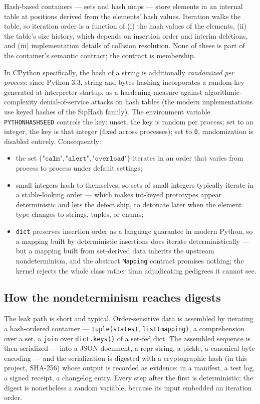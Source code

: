 Hash-based containers --- sets and hash maps --- store elements in an
internal table at positions derived from the elements' hash values.
Iteration walks the table, so iteration order is a function of (i) the hash
values of the elements, (ii) the table's size history, which depends on
insertion order and interim deletions, and (iii) implementation details of
collision resolution. None of these is part of the container's semantic
contract; the contract is membership.

In CPython specifically, the hash of a string is additionally
\emph{randomized per process}: since Python 3.3, string and bytes hashing
incorporates a random key generated at interpreter startup, as a hardening
measure against algorithmic-complexity denial-of-service attacks on hash
tables (the modern implementations use keyed hashes of the SipHash
family). The environment variable \texttt{PYTHONHASHSEED} controls the
key: unset, the key is random per process; set to an integer, the key is
that integer (fixed across processes); set to \texttt{0}, randomization is
disabled entirely. Consequently:

\begin{itemize}
\item the set $\{ \texttt{"calm"}, \texttt{"alert"}, \texttt{"overload"}
\}$ iterates in an order that varies from process to process under default
settings;
\item small integers hash to themselves, so sets of small integers
typically iterate in a stable-looking order --- which makes int-keyed
prototypes appear deterministic and lets the defect ship, to detonate later
when the element type changes to strings, tuples, or enums;
\item \texttt{dict} preserves insertion order as a language guarantee in
modern Python, so a mapping built by deterministic insertions does iterate
deterministically --- but a mapping built from set-derived data inherits
the upstream nondeterminism, and the abstract \texttt{Mapping} contract
promises nothing; the kernel rejects the whole class rather than
adjudicating pedigrees it cannot see.
\end{itemize}

\subsection{How the nondeterminism reaches digests}

The leak path is short and typical. Order-sensitive data is assembled by
iterating a hash-ordered container --- \texttt{tuple(states)},
\texttt{list(mapping)}, a comprehension over a set, a \texttt{join} over
\texttt{dict.keys()} of a set-fed dict. The assembled sequence is then
serialized --- into a JSON document, a repr string, a pickle, a canonical
byte encoding --- and the serialization is digested with a cryptographic
hash (in this project, SHA-256) whose output is recorded as evidence: in a
manifest, a test log, a signed receipt, a changelog entry. Every step
after the first is deterministic; the digest is nonetheless a random
variable, because its input embedded an iteration order.

